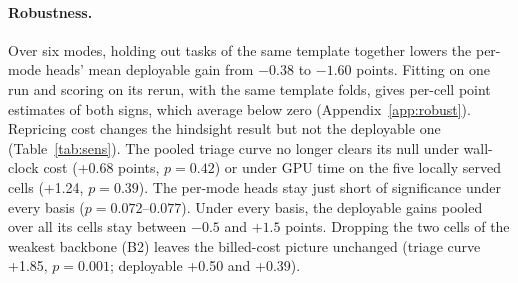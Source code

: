 \paragraph{Robustness.} Over six modes, holding out tasks of the same template together lowers the per-mode heads' mean deployable gain from $-0.38$ to $-1.60$ points. Fitting on one run and scoring on its rerun, with the same template folds, gives per-cell point estimates of both signs, which average below zero (Appendix~\ref{app:robust}). %
Repricing cost changes the hindsight result but not the deployable one (Table~\ref{tab:sens}). The pooled triage curve no longer clears its null under wall-clock cost (+0.68 points, $p=0.42$) or under GPU time on the five locally served cells (+1.24, $p=0.39$). The per-mode heads stay just short of significance under every basis ($p=0.072$--$0.077$). Under every basis, the deployable gains pooled over all its cells stay between $-0.5$ and $+1.5$ points. Dropping the two cells of the weakest backbone (B2) leaves the billed-cost picture unchanged (triage curve +1.85, $p=0.001$; deployable +0.50 and +0.39). %
